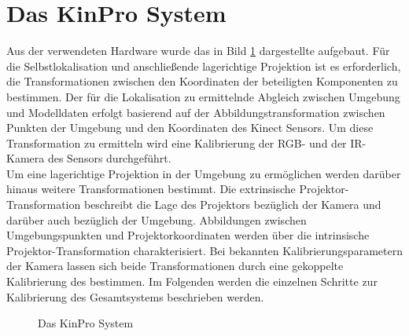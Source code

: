\section{Das KinPro System}
Aus der verwendeten Hardware wurde das in Bild \ref{fig.kinpro} dargestellte \kps{} aufgebaut. Für die Selbstlokalisation und anschließende lagerichtige Projektion ist es erforderlich, die Transformationen zwischen den Koordinaten der beteiligten Komponenten zu bestimmen. Der für die Lokalisation zu ermittelnde Abgleich zwischen Umgebung und Modelldaten erfolgt basierend auf der Abbildungstransformation zwischen Punkten der Umgebung und den Koordinaten des Kinect Sensors. Um diese Transformation zu ermitteln wird eine Kalibrierung der RGB- und der IR-Kamera des Sensors durchgeführt.\\

Um eine lagerichtige Projektion in der Umgebung zu ermöglichen werden darüber hinaus weitere Transformationen bestimmt. Die extrinsische Projektor-Transformation beschreibt die Lage des Projektors bezüglich der Kamera und darüber auch bezüglich der Umgebung. Abbildungen zwischen Umgebungspunkten und Projektorkoordinaten werden über die intrinsische Projektor-Transformation charakterisiert. Bei bekannten Kalibrierungsparametern der Kamera lassen sich beide Transformationen durch eine gekoppelte Kalibrierung des  bestimmen. Im Folgenden werden die einzelnen Schritte zur Kalibrierung des Gesamtsystems beschrieben werden.

\begin{figure}[ht]
	\begin{center}%
		\caption{Das KinPro System}
		\label{fig.kinpro}
	\end{center}
\end{figure}


